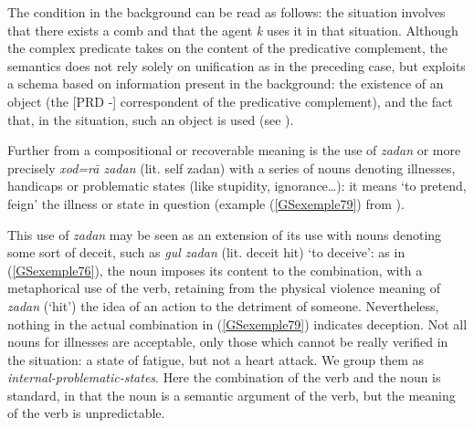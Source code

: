 \documentclass[output=paper
	        ,collection
	        ,collectionchapter
 	        ,biblatex
                ,babelshorthands
                ,newtxmath
                ,draftmode
                ,colorlinks, citecolor=brown
]{langscibook}
\begin{document}
{The condition in the background can be read as follows: the situation  involves that there exists a comb and that the agent \emph{k} uses it in that situation. Although the complex predicate takes on the content of the predicative complement, the semantics does not rely solely on unification as in the preceding case, but exploits a schema based on information present in the background: the existence of an object (the [PRD -] correspondent of the predicative complement), and the fact that, in the situation, such an object is used (see \citealt[10]{bonami2010persian}).  

Further from a compositional or recoverable meaning is the use of \emph{zadan} or more precisely \emph{xod=r\=a zadan} (lit. self zadan) with a series of nouns denoting illnesses, handicaps or problematic states (like stupidity, ignorance…): it means `to pretend, feign' the illness or state in question (example (\ref{GSexemple79}) from \citealt[223]{pollet2012grammaire}).

\z

This use of \emph{zadan} may be seen as an extension of its use with nouns denoting some sort of deceit, such as \emph{gul zadan} (lit. deceit hit) `to deceive’: as in (\ref{GSexemple76}), the noun imposes its content to the combination, with a metaphorical use of the verb, retaining from the physical violence meaning of \emph{zadan} (`hit’) the idea of an action to the detriment of someone. Nevertheless, nothing in the actual combination in (\ref{GSexemple79}) indicates deception. Not all nouns for illnesses are acceptable, only those which cannot be really verified in the situation: a state of fatigue, but not a heart attack. We group them as \emph{internal-problematic-states}. Here the combination of the verb and the noun is standard, in that the noun is a semantic argument of the verb, but the meaning of the verb is unpredictable.

}
\end{document}
